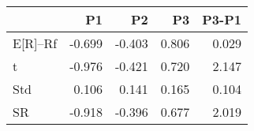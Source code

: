 \begin{tabular}{lrrrr}
\toprule
 & P1 & P2 & P3 & P3-P1 \\
\midrule
E[R]--Rf & -0.699 & -0.403 & 0.806 & 0.029 \\
t & -0.976 & -0.421 & 0.720 & 2.147 \\
Std & 0.106 & 0.141 & 0.165 & 0.104 \\
SR & -0.918 & -0.396 & 0.677 & 2.019 \\
\bottomrule
\end{tabular}

